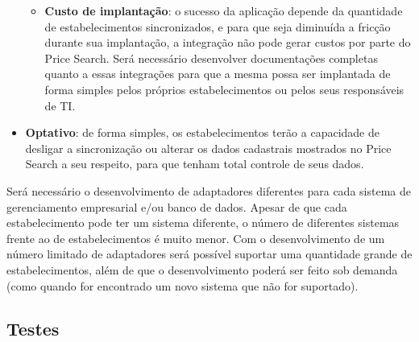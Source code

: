 \begin{itemize}
\begin{itemize}
        \item \textbf{Custo de implantação}: o sucesso da aplicação depende da quantidade de estabelecimentos sincronizados, e para que seja diminuída a fricção durante sua implantação, a integração não pode gerar custos por parte do Price Search. Será necessário desenvolver documentações completas quanto a essas integrações para que a mesma possa ser implantada de forma simples pelos próprios estabelecimentos ou pelos seus responsáveis de TI.
    \end{itemize}
    \item \textbf{Optativo}: de forma simples, os estabelecimentos terão a capacidade de desligar a sincronização ou alterar os dados cadastrais mostrados no Price Search a seu respeito, para que tenham total controle de seus dados. 
\end{itemize}

Será necessário o desenvolvimento de adaptadores diferentes para cada sistema de gerenciamento empresarial e/ou banco de dados. Apesar de que cada estabelecimento pode ter um sistema diferente, o número de diferentes sistemas frente ao de estabelecimentos é muito menor. Com o desenvolvimento de um número limitado de adaptadores será possível suportar uma quantidade grande de estabelecimentos, além de que o desenvolvimento poderá ser feito sob demanda (como quando for encontrado um novo sistema que não for suportado).

\subsection{Testes}

